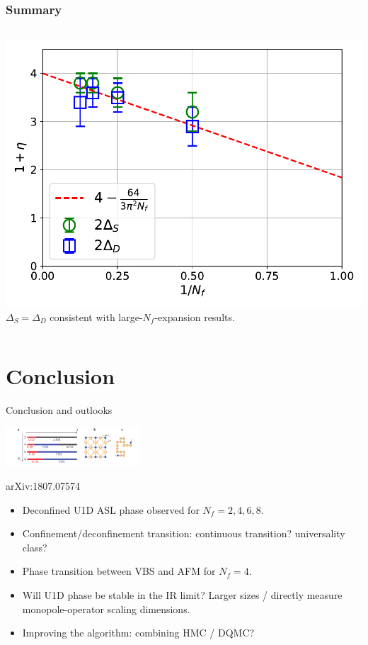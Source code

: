 \documentclass[xcolor=table, 10pt, aspectratio=169]{beamer}
\begin{document}
\begin{frame}
  \frametitle{Summary}
  \begin{columns}
    \includegraphics[width=\textwidth]{eta}
		$\Delta_S=\Delta_D$ consistent with large-$N_f$-expansion results.
  \end{columns}
\end{frame}

\section{Conclusion}

\begin{frame}{Conclusion and outlooks}
  \begin{center}
    \includegraphics[width=5cm]{phase-diagram}

		{\small arXiv:1807.07574}
  \end{center}
  \begin{itemize}
    \item Deconfined U1D ASL phase observed for $N_f=2,4,6,8$.
    \item Confinement/deconfinement transition: continuous transition? universality class?
    \item Phase transition between VBS and AFM for $N_f=4$.
    \item Will U1D phase be stable in the IR limit? Larger sizes / directly measure monopole-operator scaling dimensions.
    \item Improving the algorithm: combining HMC / DQMC?
  \end{itemize}
\end{frame}
\end{document}
